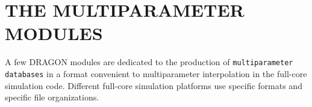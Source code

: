 \section{THE MULTIPARAMETER MODULES}\label{sect:MPOModuleInput}

A few DRAGON modules are dedicated to the production of {\tt multiparameter databases} in a format convenient to
multiparameter interpolation in the full-core simulation code. Different full-core simulation platforms use specific
formats and specific file organizations.

